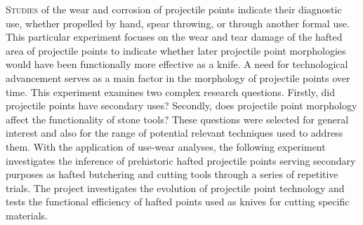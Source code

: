 	
	
\lettrine[nindent=0em,lines=3]{S}{tudies} of the wear and corrosion of projectile points indicate their diagnostic use, whether propelled by hand, spear throwing, or through another formal use. This particular experiment focuses on the wear and tear damage of the hafted area of projectile points to indicate whether later projectile point morphologies would have been functionally more effective as a knife. A need for technological advancement serves as a main factor in the morphology of projectile points over time. This experiment examines two complex research questions. Firstly, did projectile points have secondary uses? Secondly, does projectile point morphology affect the functionality of stone tools? These questions were selected for general interest and also for the range of potential relevant techniques used to address them. With the application of use-wear analyses, the following experiment investigates the inference of prehistoric hafted projectile points serving secondary purposes as hafted butchering and cutting tools through a series of repetitive trials. The project investigates the evolution of projectile point technology and tests the functional efficiency of hafted points used as knives for cutting specific materials. 
	
